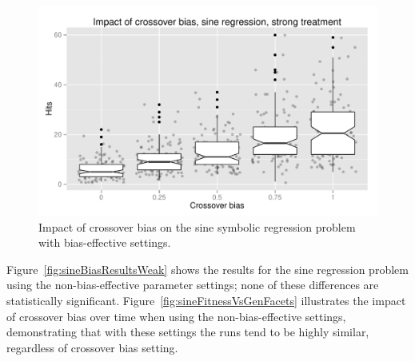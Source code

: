 \documentclass{sig-alternate}
\begin{document}
\begin{figure}
\centering
\includegraphics[width=0.45 \textwidth]{Plots/Sine_XO_impact_strong_boxplot.pdf}
\caption{Impact of crossover bias on the sine symbolic regression problem with bias-effective settings.}
\label{fig:sineBiasResultsStrong}
\end{figure}

%
%
%
%

%
%
%
%

Figure~\ref{fig:sineBiasResultsWeak} shows the results for the sine regression problem using the non-bias-effective
parameter settings; none of these differences are statistically significant. Figure~\ref{fig:sineFitnessVsGenFacets}
illustrates the impact of crossover bias over time when using the non-bias-effective settings, demonstrating that 
with these settings 
the runs tend to be highly similar, 
regardless of crossover bias setting. 

\end{document}
